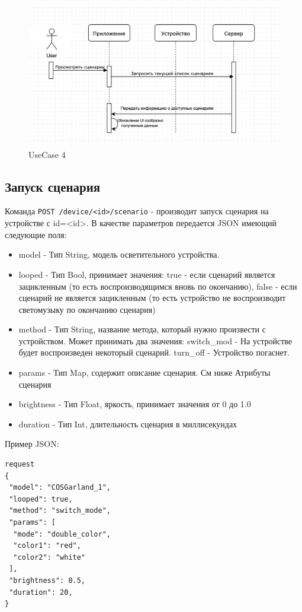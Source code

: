 \begin{figure}[ht]
   \centering
   \includegraphics[scale=.5]{figures/pic_useCase4}
    \caption{UseCase 4}
    \label{fig:pic_useCase4}
\end{figure}

\subsection{Запуск сценария}  
Команда \verb|POST /device/<id>/scenario| - производит запуск сценария на устройстве с id=<id>. В качестве параметров передается JSON имеющий следующие поля:
\begin{itemize}
\item model - Тип String, модель осветительного устройства.
\item looped - Тип Bool, принимает значения:
true - если сценарий является зацикленным (то есть воспроизводящимся вновь по окончанию),
false - если сценарий не является зацикленным (то есть устройство не воспроизводит светомузыку по окончанию сценария)
\item method - Тип String, название метода, который нужно произвести с устройством. Может принимать два значения:
switch\_mod - На устройстве будет воспроизведен некоторый сценарий.
turn\_off - Устройство погаснет.
\item params - Тип Map, содержит описание сценария. См ниже Атрибуты сценария
\item brightness - Тип Float, яркость, принимает значения от 0 до 1.0
\item duration - Тип Int, длительность сценария в миллисекундах
\end{itemize}
Пример JSON:
\begin{verbatim}
request
{
 "model": "COSGarland_1",
 "looped": true,
 "method": "switch_mode",
 "params": [
  "mode": "double_color",
  "color1": "red",
  "color2": "white"
 ],
 "brightness": 0.5,
 "duration": 20,
}   
\end{verbatim}


